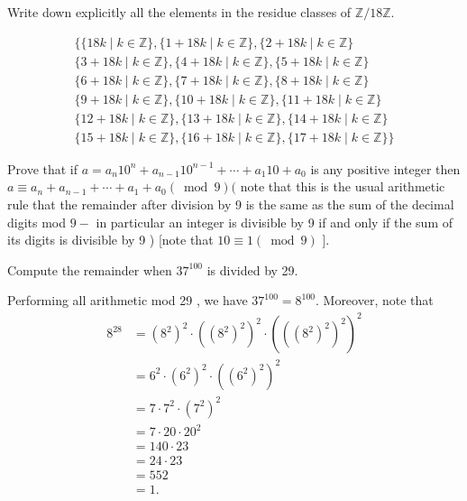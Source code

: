\begin{questions}
\question
    Write down explicitly all the elements in the residue classes of \(\mathbb{Z} / 18 \mathbb{Z}\).
\begin{solution}
    $$\begin{gathered}
        \{\{18 k \mid k \in \mathbb{Z}\},\{1+18 k \mid k \in \mathbb{Z}\},\{2+18 k \mid k \in \mathbb{Z}\} \\
        \{3+18 k \mid k \in \mathbb{Z}\},\{4+18 k \mid k \in \mathbb{Z}\},\{5+18 k \mid k \in \mathbb{Z}\} \\
        \{6+18 k \mid k \in \mathbb{Z}\},\{7+18 k \mid k \in \mathbb{Z}\},\{8+18 k \mid k \in \mathbb{Z}\} \\
        \{9+18 k \mid k \in \mathbb{Z}\},\{10+18 k \mid k \in \mathbb{Z}\},\{11+18 k \mid k \in \mathbb{Z}\} \\
        \{12+18 k \mid k \in \mathbb{Z}\},\{13+18 k \mid k \in \mathbb{Z}\},\{14+18 k \mid k \in \mathbb{Z}\} \\
        \{15+18 k \mid k \in \mathbb{Z}\},\{16+18 k \mid k \in \mathbb{Z}\},\{17+18 k \mid k \in \mathbb{Z}\}\}
        \end{gathered}$$
\end{solution}

\question
    Prove that if \(a=a_n 10^n+a_{n-1} 10^{n-1}+\cdots+a_1 10+a_0\) is any positive integer then \(a \equiv a_n+a_{n-1}+\cdots+a_1+a_0(\bmod 9)(\) note that this is the usual arithmetic rule that the remainder after division by 9 is the same as the sum of the decimal digits mod \(9-\) in particular an integer is divisible by 9 if and only if the sum of its digits is divisible by 9 ) [note that \(10 \equiv 1(\bmod 9)\) ].


\begin{solution}
    
\end{solution}

\question
    Compute the remainder when \(37^{100}\) is divided by 29.

\begin{solution}
    Performing all arithmetic mod 29 , we have \(37^{100}=8^{100}\). Moreover, note that
\[
\begin{aligned}
8^{28} & =\left(8^2\right)^2 \cdot\left(\left(8^2\right)^2\right)^2 \cdot\left(\left(\left(8^2\right)^2\right)^2\right)^2 \\
& =6^2 \cdot\left(6^2\right)^2 \cdot\left(\left(6^2\right)^2\right)^2 \\
& =7 \cdot 7^2 \cdot\left(7^2\right)^2 \\
& =7 \cdot 20 \cdot 20^2 \\
& =140 \cdot 23 \\
& =24 \cdot 23 \\
& =552 \\
& =1 .
\end{aligned}
\]


\end{solution}
\end{questions}
